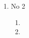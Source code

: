 \documentclass[letterpaper,11pt]{article}
\begin{document}
\begin{enumerate}
\begin{enumerate}
\end{enumerate}

\item No 2

\begin{enumerate}

\item

\item

\end{enumerate}

\end{enumerate}
\end{document}
